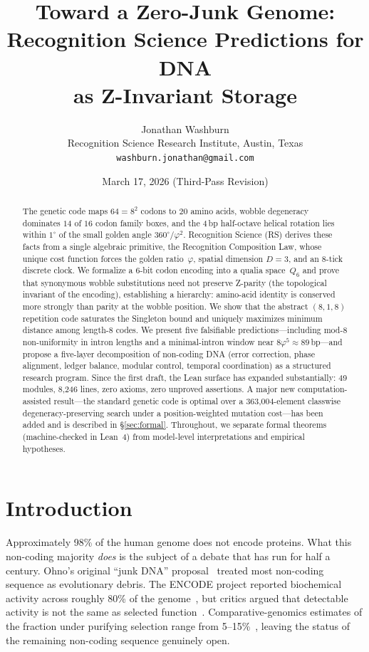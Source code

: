 \documentclass[11pt,a4paper]{article}
\title{\textbf{Toward a Zero-Junk Genome:\\[4pt]
Recognition Science Predictions for DNA\\[4pt]
as Z-Invariant Storage}}
\author{Jonathan Washburn\\
\small Recognition Science Research Institute, Austin, Texas\\
\small \texttt{washburn.jonathan@gmail.com}}
\date{March 17, 2026 (Third-Pass Revision)}
\newcommand{\ph}{\varphi}
\newcommand{\Qsix}{\ensuremath{Q_6}}
\begin{document}
\maketitle

\begin{abstract}
The genetic code maps $64 = 8^2$ codons to $20$ amino acids, wobble degeneracy dominates $14$ of $16$ codon family boxes, and the $4$\,bp half-octave helical rotation lies within $1^\circ$ of the small golden angle $360^\circ/\ph^2$.
Recognition Science (RS) derives these facts from a single algebraic primitive, the Recognition Composition Law, whose unique cost function forces the golden ratio~$\ph$, spatial dimension $D{=}3$, and an 8-tick discrete clock.
We formalize a $6$-bit codon encoding into a qualia space~\Qsix{} and prove that synonymous wobble substitutions need not preserve Z-parity (the topological invariant of the encoding), establishing a hierarchy: amino-acid identity is conserved more strongly than parity at the wobble position.
We show that the abstract $(8,1,8)$ repetition code saturates the Singleton bound and uniquely maximizes minimum distance among length-$8$ codes.
We present five falsifiable predictions---including mod-$8$ non-uniformity in intron lengths and a minimal-intron window near $8\ph^5 \approx 89$\,bp---and propose a five-layer decomposition of non-coding DNA (error correction, phase alignment, ledger balance, modular control, temporal coordination) as a structured research program.
Since the first draft, the Lean surface has expanded substantially: 49 modules, 8,246 lines, zero axioms, zero unproved assertions.
A major new computation-assisted result---the standard genetic code is optimal over a 363,004-element classwise degeneracy-preserving search under a position-weighted mutation cost---has been added and is described in \S\ref{sec:formal}.
Throughout, we separate formal theorems (machine-checked in Lean~4) from model-level interpretations and empirical hypotheses.
\end{abstract}

\tableofcontents

\section{Introduction}
\label{sec:intro}

Approximately 98\% of the human genome does not encode proteins. What this non-coding majority \emph{does} is the subject of a debate that has run for half a century. Ohno's original ``junk DNA'' proposal~\cite{Ohno1972} treated most non-coding sequence as evolutionary debris. The ENCODE project reported biochemical activity across roughly 80\% of the genome~\cite{ENCODE2012}, but critics argued that detectable activity is not the same as selected function~\cite{Graur2013, Doolittle2013}. Comparative-genomics estimates of the fraction under purifying selection range from 5--15\%~\cite{Ponting2011, Rands2014, Kellis2014}, leaving the status of the remaining non-coding sequence genuinely open.
\end{document}
